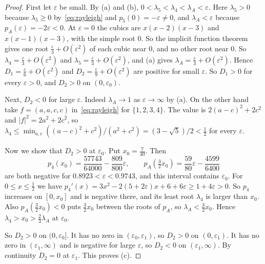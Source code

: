 \documentclass[EJP,preprint]{ejpecp}
\begin{document}
\begin{proof}
First let $\varepsilon$ be small. By (a) and (b),
$0<\lambda_5<\lambda_4<\lambda_A<\varepsilon$. Here $\lambda_5>0$ because
$\lambda_5\ge0$ by~\eqref{eq:rayleigh} and $p_5(0)=-\varepsilon\ne0$, and
$\lambda_A<\varepsilon$ because $p_A(\varepsilon)=-2\varepsilon<0$. At $\varepsilon=0$ the cubics are
$x(x-2)(x-3)$ and $x(x-1)(x-3)$, with the simple root $0$. So the implicit
function theorem gives one root $\frac\varepsilon3+O(\varepsilon^2)$ of each
cubic near $0$, and no other root near $0$. So
$\lambda_4=\frac\varepsilon3+O(\varepsilon^2)$ and
$\lambda_5=\frac\varepsilon3+O(\varepsilon^2)$, and (a) gives
$\lambda_A=\frac\varepsilon3+O(\varepsilon^2)$. Hence
$D_1=\frac\varepsilon6+O(\varepsilon^2)$ and
$D_2=\frac\varepsilon9+O(\varepsilon^2)$ are positive for small
$\varepsilon$. So $D_1>0$ for every $\varepsilon>0$, and $D_2>0$ on
$(0,\varepsilon_0)$.

Next, $D_2<0$ for large $\varepsilon$. Indeed $\lambda_A\to1$ as
$\varepsilon\to\infty$ by (a). On the other hand take $f=(a,a,c,c)$
in~\eqref{eq:rayleigh} for $\{1,2,3,4\}$. The value is $2(a-c)^2+2c^2$ and
$\lvert f\rvert^2=2a^2+2c^2$, so
$\lambda_4\le\min_{a,c}((a-c)^2+c^2)/(a^2+c^2)=(3-\sqrt5)/2<\frac12$ for every
$\varepsilon$.

Now we show that $D_2>0$ at $\varepsilon_0$. Put $x_0=\frac7{40}$. Then
\[
 p_4(x_0)=\frac{57743}{64000}-\frac{809}{800}\varepsilon,\qquad
 p_A(\tfrac32x_0)=\frac{59}{80}\varepsilon-\frac{4599}{6400}
\]
are both negative for $0.8923<\varepsilon<0.9743$, and this interval contains
$\varepsilon_0$. For $0\le x\le\frac12$ we have
$p_4'(x)=3x^2-2(5+2\varepsilon)x+6+6\varepsilon\ge1+4\varepsilon>0$. So $p_4$
increases on $[0,x_0]$ and is negative there, and its least root
$\lambda_4$ is larger than $x_0$. Also $p_A(\frac32x_0)<0$ puts $\frac32x_0$
between the roots of $p_A$, so $\lambda_A<\frac32x_0$. Hence
$\lambda_4>x_0>\frac23\lambda_A$ at $\varepsilon_0$.

So $D_2>0$ on $(0,\varepsilon_0]$. It has no zero in
$(\varepsilon_0,\varepsilon_1)$, so $D_2>0$ on $(0,\varepsilon_1)$. It has no
zero in $(\varepsilon_1,\infty)$ and is negative for large $\varepsilon$, so
$D_2<0$ on $(\varepsilon_1,\infty)$. By continuity $D_2=0$ at
$\varepsilon_1$. This proves (c).


\end{proof}
\end{document}
